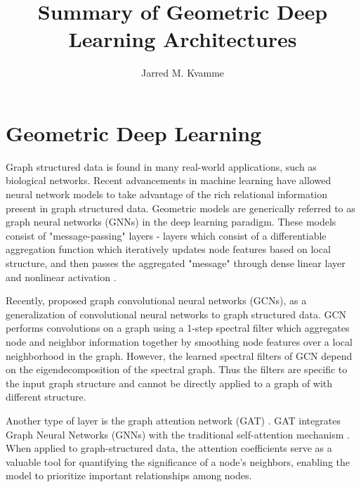 \documentclass[a4paper,12pt]{article}
\begin{document}
	\begin{titlepage}
		\title{Summary of Geometric Deep Learning Architectures}
		\author{Jarred M. Kvamme}
		\maketitle
	\end{titlepage}
	
	\newpage
	\tableofcontents{}
	\listoffigures
	\newpage
	\clearpage
	\section{Geometric Deep Learning}
	Graph structured data is found in many real-world applications, such as biological networks. Recent advancements in machine learning have allowed neural network models to take advantage of the rich relational information present in graph structured data. Geometric models are generically referred to as graph neural networks (GNNs) in the deep learning paradigm. These models consist of "message-passing" layers - layers which consist of a differentiable aggregation function which iteratively updates node features based on local structure, and then passes the aggregated "message" through dense linear layer and nonlinear activation \cite{scarselli2008graph,gori2005new}. 
	
 	Recently, \cite{kipf2016semi} proposed graph convolutional neural networks (GCNs), as a generalization of convolutional neural networks to graph structured data. GCN performs convolutions on a graph using a 1-step spectral filter which aggregates node and neighbor information together by smoothing node features over a local neighborhood in the graph. However, the learned spectral filters of GCN depend on the eigendecomposition of the spectral graph. Thus the filters are specific to the input graph structure and cannot be directly applied to a graph of with different structure. 
 	
 	Another type of layer is the graph attention network (GAT) \cite{velivckovic2017graph}. GAT integrates Graph Neural Networks (GNNs) with the traditional self-attention mechanism \cite{bahdanau2014neural}. When applied to graph-structured data, the attention coefficients serve as a valuable tool for quantifying the significance of a node's neighbors, enabling the model to prioritize important relationships among nodes.
\end{document}
